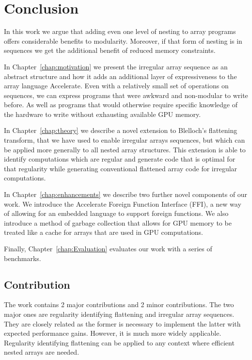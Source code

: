 \chapter{Conclusion}

In this work we argue that adding even one level of nesting to array programs offers considerable benefits to modularity. Moreover, if that form of nesting is in sequences we get the additional benefit of reduced memory constraints.

In Chapter~\ref{chap:motivation} we present the irregular array sequence as an abstract structure and how it adds an additional layer of expressiveness to the array language Accelerate. Even with a relatively small set of operations on sequences, we can express programs that were awkward and non-modular to write before. As well as programs that would otherwise require specific knowledge of the hardware to write without exhausting available GPU memory.

In Chapter~\ref{chap:theory} we describe a novel extension to Blelloch's flattening transform, that we have used to enable irregular arrays sequences, but which can be applied more generally to all nested array structures. This extension is able to identify computations which are regular and generate code that is optimal for that regularity while generating conventional flattened array code for irregular computations.

In Chapter~\ref{chap:enhancements} we describe two further novel components of our work. We introduce the Accelerate Foreign Function Interface (FFI), a new way of allowing for an embedded language to support foreign functions. We also introduce a method of garbage collection that allows for GPU memory to be treated like a cache for arrays that are used in GPU computations.

Finally, Chapter~\ref{chap:Evaluation} evaluates our work with a series of benchmarks.

\section{Contribution}

The work contains 2 major contributions and 2 minor contributions. The two major ones are regularity identifying flattening and irregular array sequences. They are closely related as the former is necessary to implement the latter with expected performance gains. However, it is much more widely applicable. Regularity identifying flattening can be applied to any context where efficient nested arrays are needed.

